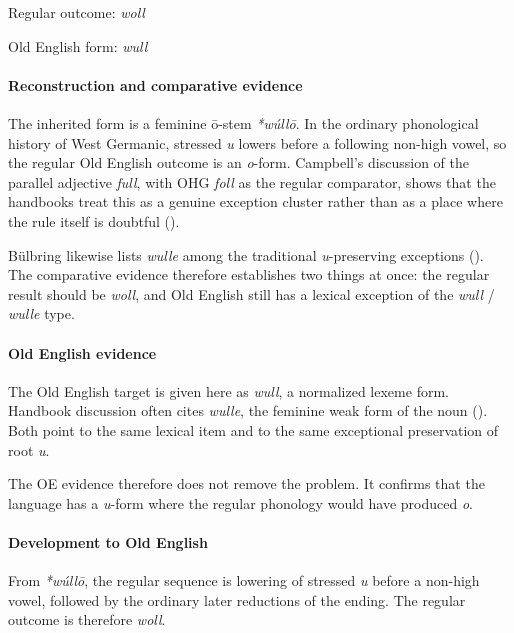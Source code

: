 \documentclass[
  british,
  a4paper,
]{article}
\begin{document}
Regular outcome: \emph{woll}

Old English form: \emph{wull}

\paragraph{Reconstruction and comparative
evidence}\label{reconstruction-and-comparative-evidence-76}

The inherited form is a feminine ō-stem \emph{*wúllō}. In the ordinary
phonological history of West Germanic, stressed \emph{u} lowers before a
following non-high vowel, so the regular Old English outcome is an
\emph{o}-form. Campbell's discussion of the parallel adjective
\emph{full}, with OHG \emph{foll} as the regular comparator, shows that
the handbooks treat this as a genuine exception cluster rather than as a
place where the rule itself is doubtful
().

Bülbring likewise lists \emph{wulle} among the traditional
\emph{u}-preserving exceptions (). The comparative evidence therefore establishes two
things at once: the regular result should be \emph{woll}, and Old
English still has a lexical exception of the \emph{wull} / \emph{wulle}
type.

\paragraph{Old English evidence}\label{old-english-evidence-76}

The Old English target is given here as \emph{wull}, a normalized lexeme
form. Handbook discussion often cites \emph{wulle}, the feminine weak
form of the noun (). Both point to the same lexical item and to the same exceptional
preservation of root \emph{u}.

The OE evidence therefore does not remove the problem. It confirms that
the language has a \emph{u}-form where the regular phonology would have
produced \emph{o}.

\paragraph{Development to Old
English}\label{development-to-old-english-76}

From \emph{*wúllō}, the regular sequence is lowering of stressed
\emph{u} before a non-high vowel, followed by the ordinary later
reductions of the ending. The regular outcome is therefore \emph{woll}.
\end{document}
